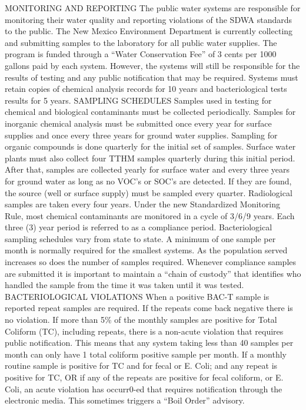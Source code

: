 \documentclass{article}
\begin{document}
MONITORING AND REPORTING The public water systems are responsible for monitoring their water quality and reporting violations of the SDWA standards to the public. The New Mexico Environment Department is currently collecting and submitting samples to the laboratory for all public water supplies. The program is funded through a “Water Conservation Fee” of 3 cents per 1000 gallons paid by each system. However, the systems will still be responsible for the results of testing and any public notification that may be required. Systems must retain copies of chemical analysis records for 10 years and bacteriological tests results for 5 years. SAMPLING SCHEDULES Samples used in testing for chemical and biological contaminants must be collected periodically. Samples for inorganic chemical analysis must be submitted once every year for surface supplies and once every three years for ground water supplies. Sampling for organic compounds is done quarterly for the initial set of samples. Surface water plants must also collect four TTHM samples quarterly during this initial period. After that, samples are collected yearly for surface water and every three years for ground water as long as no VOC’s or SOC’s are detected. If they are found, the source (well or surface supply) must be sampled every quarter. Radiological samples are taken every four years. Under the new Standardized Monitoring Rule, most chemical contaminants are monitored in a cycle of 3/6/9 years. Each three (3) year period is referred to as a compliance period. Bacteriological sampling schedules vary from state to state. A minimum of one sample per month is normally required for the smallest systems. As the population served increases so does the number of samples required. Whenever compliance samples are submitted it is important to maintain a “chain of custody” that identifies who handled the sample from the time it was taken until it was tested.  \\
BACTERIOLOGICAL VIOLATIONS When a positive BAC-T sample is reported repeat samples are required. If the repeats come back negative there is no violation. If more than 5\% of the monthly samples are positive for Total Coliform (TC), including repeats, there is a non-acute violation that requires public notification. This means that any system taking less than 40 samples per month can only have 1 total coliform positive sample per month. If a monthly routine sample is positive for TC and for fecal or E. Coli; and any repeat is positive for TC, OR if any of the repeats are positive for fecal coliform, or E. Coli, an acute violation has occurr0-ed that requires notification through the electronic media. This sometimes triggers a “Boil Order” advisory.  \\
\end{document}
